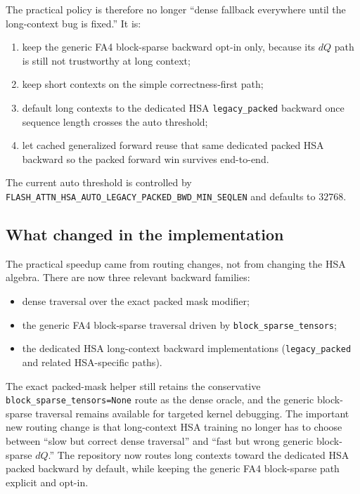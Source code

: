 \documentclass[11pt]{article}
\begin{document}
The practical policy is therefore no longer ``dense fallback everywhere until
the long-context bug is fixed.'' It is:
\begin{enumerate}[leftmargin=1.5em]
    \item keep the generic FA4 block-sparse backward opt-in only, because its
    $dQ$ path is still not trustworthy at long context;
    \item keep short contexts on the simple correctness-first path;
    \item default long contexts to the dedicated HSA \texttt{legacy\_packed}
    backward once sequence length crosses the auto threshold;
    \item let cached generalized forward reuse that same dedicated packed HSA
    backward so the packed forward win survives end-to-end.
\end{enumerate}

The current auto threshold is controlled by
\texttt{FLASH\_ATTN\_HSA\_AUTO\_LEGACY\_PACKED\_BWD\_MIN\_SEQLEN} and defaults
to $32768$.

\subsection{What changed in the implementation}

The practical speedup came from routing changes, not from changing the HSA
algebra. There are now three relevant backward families:
\begin{itemize}[leftmargin=1.5em]
    \item dense traversal over the exact packed mask modifier;
    \item the generic FA4 block-sparse traversal driven by
    \texttt{block\_sparse\_tensors};
    \item the dedicated HSA long-context backward implementations
    (\texttt{legacy\_packed} and related HSA-specific paths).
\end{itemize}

The exact packed-mask helper still retains the conservative
\texttt{block\_sparse\_tensors=None} route as the dense oracle, and the generic
block-sparse traversal remains available for targeted kernel debugging. The
important new routing change is that long-context HSA training no longer has to
choose between ``slow but correct dense traversal'' and ``fast but wrong generic
block-sparse $dQ$.'' The repository now routes long contexts toward the
dedicated HSA packed backward by default, while keeping the generic FA4
block-sparse path explicit and opt-in.
\end{document}

